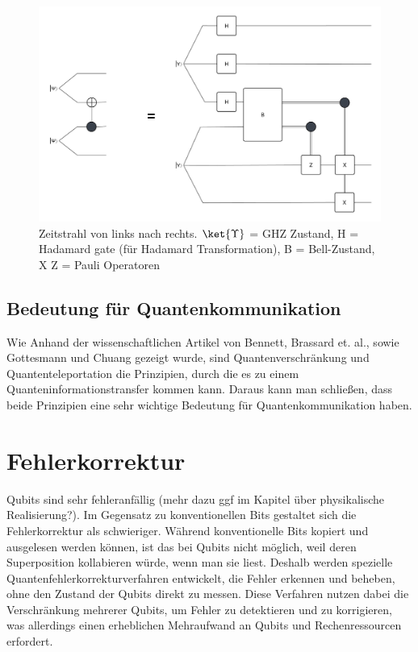 \begin{figure}[h!]
    \centering
    \includegraphics[width=1.0\textwidth]{images/quantum-information/quantenteleportation_cnot_3.jpeg}
    \caption{Zeitstrahl von links nach rechts. \(\ket{\Upsilon}\) = GHZ Zustand, H = Hadamard gate (für Hadamard Transformation), B = Bell-Zustand, X Z = Pauli Operatoren}
    \label{fig:meinbild}
\end{figure}
\newpage

\subsection{Bedeutung für Quantenkommunikation}
Wie Anhand der wissenschaftlichen Artikel von Bennett, Brassard et. al., sowie Gottesmann und Chuang gezeigt wurde, sind Quantenverschränkung und Quantenteleportation die Prinzipien, durch die es zu einem Quanteninformationstransfer kommen kann. Daraus kann man schließen, dass beide Prinzipien eine sehr wichtige Bedeutung für Quantenkommunikation haben.

\section{Fehlerkorrektur}
Qubits sind sehr fehleranfällig (mehr dazu ggf im Kapitel über physikalische Realisierung?). Im Gegensatz zu konventionellen Bits gestaltet sich die Fehlerkorrektur als schwieriger. Während konventionelle Bits kopiert und ausgelesen werden können, ist das bei Qubits nicht möglich, weil deren Superposition kollabieren würde, wenn man sie liest. Deshalb werden spezielle Quantenfehlerkorrekturverfahren entwickelt, die Fehler erkennen und beheben, ohne den Zustand der Qubits direkt zu messen. Diese Verfahren nutzen dabei die Verschränkung mehrerer Qubits, um Fehler zu detektieren und zu korrigieren, was allerdings einen erheblichen Mehraufwand an Qubits und Rechenressourcen erfordert.


